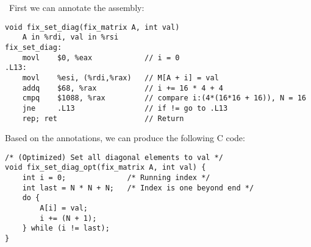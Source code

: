 \documentclass[12pt]{article}
\newenvironment{sol}[1][Solution]{\begin{trivlist}
		\item[\hskip \labelsep {\bfseries #1:}]}{\end{trivlist}}
\begin{document}
{\begin{sol}
	\
	First we can annotate the assembly:
	\begin{lstlisting}[language={}]
	void fix_set_diag(fix_matrix A, int val)
	A in %rdi, val in %rsi
fix_set_diag:
	movl	$0, %eax			// i = 0
.L13:
	movl	%esi, (%rdi,%rax)	// M[A + i] = val
	addq	$68, %rax			// i += 16 * 4 + 4
	cmpq	$1088, %rax			// compare i:(4*(16*16 + 16)), N = 16
	jne		.L13				// if != go to .L13
	rep; ret					// Return
	\end{lstlisting}
	Based on the annotations, we can produce the following C code:
	\begin{lstlisting}
/* (Optimized) Set all diagonal elements to val */
void fix_set_diag_opt(fix_matrix A, int val) {
	int i = 0;				/* Running index */
	int last = N * N + N;	/* Index is one beyond end */
	do {
		A[i] = val;
		i += (N + 1);
	} while (i != last);
}
	\end{lstlisting}
\end{sol}
\end{document}

